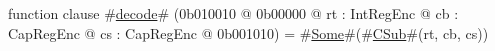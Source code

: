 function clause #\hyperref[sailMIPSzdecode]{decode}# (0b010010 @ 0b00000 @ rt : IntRegEnc @ cb : CapRegEnc @ cs : CapRegEnc @ 0b001010) = #\hyperref[sailMIPSzSome]{Some}#(#\hyperref[sailMIPSzCSub]{CSub}#(rt, cb, cs))
